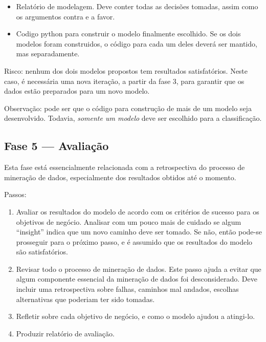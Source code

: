 \documentclass[12pt,oneside,a4paper]{article}
\begin{document}
\begin{itemize}

\item Relatório de modelagem. Deve conter todas as decisões tomadas, assim como os argumentos contra e a favor. 

\item Codigo python para construir o modelo finalmente escolhido. Se os dois modelos foram construidos, o código para cada um deles deverá ser mantido, mas separadamente.
  
\end{itemize}

Risco: nenhum dos dois modelos propostos tem resultados satisfatórios. Neste caso, é necessária uma nova iteração, a partir da fase 3, para garantir que os dados estão preparados para um novo modelo.

Observação: pode ser que o código para construção de mais de um modelo seja desenvolvido. Todavia, \textit{somente um modelo} deve ser escolhido para a classificação.

\subsection{Fase 5 --- Avaliação}

Esta fase está essencialmente relacionada com a retrospectiva do processo de mineração de dados, especialmente dos resultados obtidos até o momento.

Passos:

\begin{enumerate}

\item Avaliar os resultados do modelo de acordo com os critérios de sucesso para os objetivos de negócio. Analisar com um pouco mais de cuidado se algum ``insight'' indica que um novo caminho deve ser tomado. Se não, então pode-se prosseguir para o próximo passo, e é assumido que os resultados do modelo são satisfatórios.

\item Revisar todo o processo de mineração de dados. Este passo ajuda a evitar que algum componente essencial da mineração de dados foi desconsiderado. Deve incluir uma retrospectiva sobre falhas, caminhos mal andados, escolhas alternativas que poderiam ter sido tomadas.

\item Refletir sobre cada objetivo de negócio, e como o modelo ajudou a atingi-lo.

\item Produzir relatório de avaliação.
  
\end{enumerate}
\end{document}
